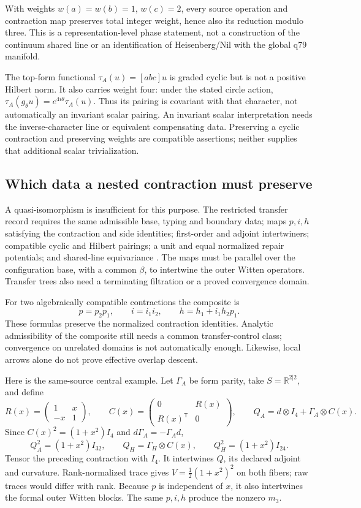 \documentclass[11pt,a4paper]{article}
\begin{document}
With weights \(w(a)=w(b)=1\), \(w(c)=2\), every source operation and
contraction map preserves total integer weight, hence also its reduction
modulo three. This is a representation-level phase statement, not a
construction of the continuum shared line or an identification of
Heisenberg/Nil with the global q79 manifold.

The top-form functional \(\tau_A(u)=[abc]u\) is graded cyclic but is not a
positive Hilbert norm. It also carries weight four: under the stated
circle action, \(\tau_A(g_\theta u)=e^{4i\theta}\tau_A(u)\).
Thus its pairing is covariant with that character, not automatically an
invariant scalar pairing. An invariant scalar interpretation needs the
inverse-character line or equivalent compensating data. Preserving a
cyclic contraction and preserving weights are compatible assertions;
neither supplies that additional scalar trivialization.

\subsection{Which data a nested contraction must preserve}
\label{sec:restricted-nested-arrow}
A quasi-isomorphism is insufficient for this purpose. The restricted
transfer record requires the same admissible base, typing and boundary
data; maps \(p,i,h\) satisfying the contraction and side identities;
first-order and adjoint intertwiners; compatible cyclic and Hilbert
pairings; a unit and equal normalized repair potentials; and shared-line
equivariance \cite{PreprojectionRestrictedNested2026}. The maps must be
parallel over the configuration base, with a common \(\beta\), to
intertwine the outer Witten operators. Transfer trees also need a
terminating filtration or a proved convergence domain.

For two algebraically compatible contractions the composite is
\[
 p=p_2p_1,\qquad i=i_1i_2,\qquad h=h_1+i_1h_2p_1.
\]
These formulas preserve the normalized contraction identities. Analytic
admissibility of the composite still needs a common transfer-control
class; convergence on unrelated domains is not automatically enough.
Likewise, local arrows alone do not prove effective overlap descent.

Here is the same-source central example. Let \(\Gamma_A\) be form parity,
take \(S=\mathbb R^{2|2}\), and define
\[
 R(x)=\begin{pmatrix}1&x\\-x&1\end{pmatrix},\qquad
 C(x)=\begin{pmatrix}0&R(x)\\R(x)^{\mathsf T}&0\end{pmatrix},\qquad
 Q_A=d\otimes I_4+\Gamma_A\otimes C(x).
\]
Since \(C(x)^2=(1+x^2)I_4\) and \(d\Gamma_A=-\Gamma_A d\),
\[
 Q_A^2=(1+x^2)I_{32},\qquad
 Q_H=\Gamma_H\otimes C(x),\qquad Q_H^2=(1+x^2)I_{24}.
\]
Tensor the preceding contraction with \(I_4\). It intertwines \(Q\),
its declared adjoint and curvature. Rank-normalized trace gives
\(V=\frac12(1+x^2)^2\) on both fibers; raw traces would differ with rank.
Because \(p\) is independent of \(x\), it also intertwines the formal
outer Witten blocks. The same \(p,i,h\) produce the nonzero \(m_3\).
\end{document}
